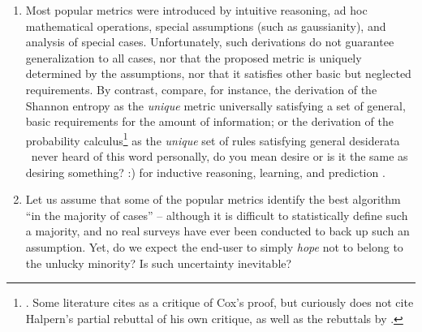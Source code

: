 \documentclass[\ifafour a4paper,12pt,\else a5paper,10pt,\fi%
onecolumn,oneside,article,%
british%
]{memoir}
\theoremstyle{remark}
\theoremstyle{innote}
\newcommand*{\wrench}{{\fontencoding{U}\fontfamily{fontawesomethree}\selectfont\symbol{114}}}
\newcommand{\mynotew}[1]{{\footnotesize\color{notecolour}\wrench\ #1}}
\renewcommand*{\|}[1][]{\nonscript\:#1\vert\nonscript\:\mathopen{}}
\newcommand*{\sect}{\S}%
\newcommand*{\chap}{ch.}%
\newcommand*{\chaps}{chs}%
\begin{document}
\begin{enumerate}
\item\label{item:ad_hoc} Most popular metrics were introduced by intuitive reasoning, ad hoc mathematical operations, special assumptions (such as gaussianity\autocites[e.g.][\sect~31 p.~183 for the Matthews correlation coefficient]{fisher1925_r1963}), and analysis of special cases. Unfortunately, such derivations do not guarantee generalization to all cases, nor that the proposed metric is uniquely determined by the assumptions, nor that it satisfies other basic but neglected requirements. By contrast, compare, for instance, the derivation of the Shannon entropy \autocites{shannon1948}[\sect~3.2]{woodward1953_r1964}[also][]{goodetal1968} as the \emph{unique} metric universally satisfying a set of general, basic requirements for the amount of information; or the derivation of the probability calculus\footnote{\cites{cox1946,fine1973}[\chaps~1--2]{jaynes1994_r2003}. Some literature cites \cite{halpern1999} as a critique of Cox's proof, but curiously does not cite Halpern's \cite*{halpern1999b} partial rebuttal of his own critique, as well as the rebuttals by \cite{snow1998,snow2001}.} as the \emph{unique} set of rules satisfying general desiderata \mynotew{never heard of this word personally, do you mean desire or is it the same as desiring something? :)} for inductive reasoning, learning, and prediction \autocites{selfetal1987,cheeseman1988}[\chap~12]{russelletal1995_r2022}.
  
\item\label{item:hope_medical} Let us assume that some of the popular metrics identify the best algorithm \enquote{in the majority of cases} -- although it is difficult to statistically define such a majority, and no real surveys have ever been conducted to back up such an assumption. Yet, do we expect the end-user to simply \emph{hope} not to belong to the unlucky minority? Is such uncertainty inevitable?


\end{enumerate}
\end{document}
